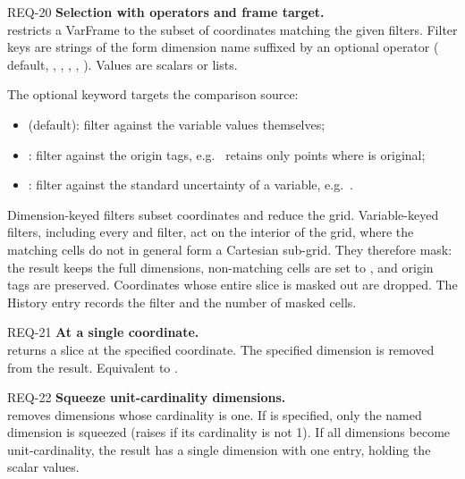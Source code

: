 \begin{reqbox}{REQ-20}{\stable}
\textbf{Selection with operators and frame target.}\\
 restricts a VarFrame to the
subset of coordinates matching the given filters. Filter keys are
 strings of the form dimension name suffixed by an optional
operator (\code{=} default, \code{>}, \code{>=}, \code{<}, \code{<=},
\code{!=}). Values are scalars or lists.

The optional  keyword targets the comparison source:
\begin{itemize}[noitemsep,topsep=2pt]
  \item {} (default): filter against the variable
    values themselves;
  \item {}: filter against the origin tags,
    e.g.\  retains only
    points where  is original;
  \item {}: filter against the standard uncertainty
    of a variable, e.g.\ .
\end{itemize}

Dimension-keyed filters subset coordinates and reduce the grid.
Variable-keyed filters, including every  and
 filter, act on the interior of the grid, where
the matching cells do not in general form a Cartesian sub-grid. They
therefore mask: the result keeps the full dimensions, non-matching cells
are set to , and origin tags are preserved. Coordinates whose
entire slice is masked out are dropped. The History entry records the
filter and the number of masked cells.
\end{reqbox}

\begin{reqbox}{REQ-21}{\stable}
\textbf{At a single coordinate.}\\
 returns a slice at the specified coordinate. The
specified dimension is removed from the result. Equivalent to
.
\end{reqbox}

\begin{reqbox}{REQ-22}{\stable}
\textbf{Squeeze unit-cardinality dimensions.}\\
 removes dimensions whose cardinality is one.
If  is specified, only the named dimension is squeezed (raises
if its cardinality is not 1). If all dimensions become unit-cardinality,
the result has a single  dimension with one entry, holding
the scalar values.
\end{reqbox}


